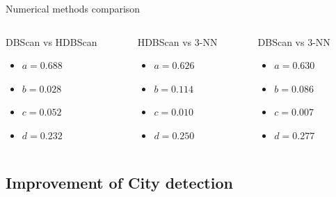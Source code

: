 \begin{frame}{Numerical methods comparison}
    \begin{columns}
        \begin{column}{0.22\paperwidth}
            \begin{block}{DBScan vs HDBScan}
                \begin{itemize}
                    \item $a=0.688$
                    \item $b=0.028$
                    \item $c=0.052$
                    \item $d=0.232$
                \end{itemize}
            \end{block}
        \end{column}
        \begin{column}{0.22\paperwidth}
            \begin{block}{HDBScan vs 3-NN}
                \begin{itemize}
                    \item $a=0.626$
                    \item $b=0.114$
                    \item $c=0.010$
                    \item $d=0.250$
                \end{itemize}
            \end{block}
        \end{column}
        \begin{column}{0.22\paperwidth}
            \begin{block}{DBScan vs 3-NN}
                \begin{itemize}
                    \item $a=0.630$
                    \item $b=0.086$
                    \item $c=0.007$
                    \item $d=0.277$
                \end{itemize}
            \end{block}
        \end{column}
    \end{columns}
\end{frame}

\subsection{Improvement of City detection}
\insertsubsectionframe

